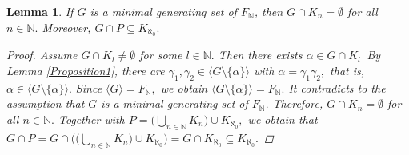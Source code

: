 \documentclass[11pt]{article}
\theoremstyle{plain}
\newtheorem{lemma}[theorem]{Lemma}
\theoremstyle{definition}
\begin{document}
\begin{lemma}\label{Corollary2}
If $G$ is a minimal generating set of $F_{\mathbb{N}}$, then $G\cap K_{n}=\emptyset$ for all $n\in\mathbb{N}.$ Moreover, $G\cap P\subseteq K_{\aleph_{0}}.$
\begin{proof}
Assume $G\cap K_{l}\not=\emptyset$ for some $l\in\mathbb{N}.$ Then there exists $\alpha\in G\cap K_{l.}$ By Lemma \ref{Proposition1}, there are $\gamma_{1},\gamma_{2}\in\langle G\setminus\{\alpha\}\rangle$ with $\alpha=\gamma_{1}\gamma_{2},$ that is, $\alpha\in\langle G\setminus \{\alpha\}\rangle.$ Since $\langle G\rangle=F_{\mathbb{N}},$ we obtain $\langle G\setminus\{\alpha\}\rangle=F_{\mathbb{N}}.$ It contradicts to the assumption that $G$ is a minimal generating set of $F_{\mathbb{N}}.$ Therefore, $G\cap K_{n}=\emptyset$ for all $n\in\mathbb{N}.$ Together with $P=\big(\bigcup_{n\in\mathbb{N}}K_{n}\big)\cup K_{\aleph_{0}},$ we obtain that $G\cap P=G\cap\big(\big(\bigcup_{n\in\mathbb{N}}K_{n}\big)\cup K_{\aleph_{0}}\big)=G\cap K_{\aleph_{0}}\subseteq K_{\aleph_{0}}.$ 
\end{proof}
\end{lemma}
\end{document}
